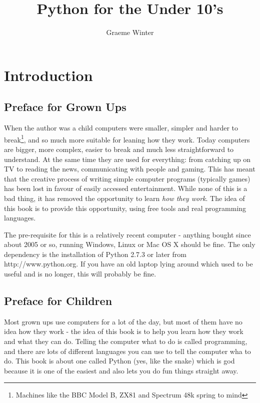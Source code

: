 \documentclass[a4paper, 11pt]{book}
\title{Python for the Under 10's}
\author{Graeme Winter}
\begin{document}
\maketitle
\clearpage
\chapter{Introduction}

\section{Preface for Grown Ups}

When the author was a child computers were smaller, simpler and harder to break\footnote{Machines like the BBC Model B, ZX81 and Spectrum 48k spring to mind}, and so much more suitable for leaning how they work. Today computers are bigger, more complex, easier to break and much less straightforward to understand. At the same time they are used for everything: from catching up on TV to reading the news, communicating with people and gaming. This has meant that the creative process of writing simple computer programs (typically games) has been lost in favour of easily accessed entertainment. While none of this is a bad thing, it has removed the opportunity to learn \emph{how they work}. The idea of this book is to provide this opportunity, using free tools and real programming languages. 

The pre-requisite for this is a relatively recent computer - anything bought since about 2005 or so, running Windows, Linux or Mac OS X should be fine. The only dependency is the installation of Python 2.7.3 or later from http://www.python.org. If you have an old laptop lying around which used to be useful and is no longer, this will probably be fine. 

\section{Preface for Children}

Most grown ups use computers for a lot of the day, but most of them have no idea how they work - the idea of this book is to help you learn how they work and what they can do. Telling the computer what to do is called programming, and there are lots of different languages you can use to tell the computer wha to do. This book is about one called Python (yes, like the snake) which is god because it is one of the easiest and also lets you do fun things straight away.
\end{document}
